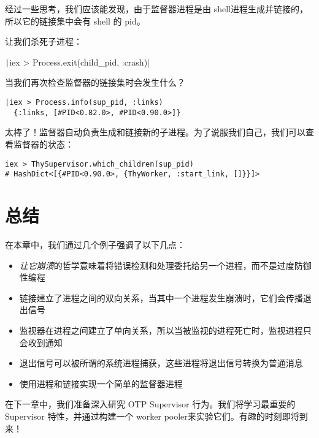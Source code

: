 经过一些思考，我们应该能发现，由于监督器进程是由 shell进程生成并链接的，所以它的链接集中会有 shell 的 pid。

让我们杀死子进程：

\texttt|iex > Process.exit(child_pid, :crash)|

当我们再次检查监督器的链接集时会发生什么？

\begin{verbatim}
|iex > Process.info(sup_pid, :links)
  {:links, [#PID<0.82.0>, #PID<0.90.0>]}
\end{verbatim}

太棒了！监督器自动负责生成和链接新的子进程。为了说服我们自己，我们可以查看监督器的状态：

\begin{verbatim}
iex > ThySupervisor.which_children(sup_pid)
# HashDict<[{#PID<0.90.0>, {ThyWorker, :start_link, []}}]>
\end{verbatim}

\section{总结}

在本章中，我们通过几个例子强调了以下几点：

\begin{itemize}

\item  \emph{让它崩溃}的哲学意味着将错误检测和处理委托给另一个进程，而不是过度防御性编程
\item  链接建立了进程之间的双向关系，当其中一个进程发生崩溃时，它们会传播退出信号
\item  监视器在进程之间建立了单向关系，所以当被监视的进程死亡时，监视进程只会收到通知
\item  退出信号可以被所谓的系统进程捕获，这些进程将退出信号转换为普通消息
\item  使用进程和链接实现一个简单的监督器进程
\end{itemize}

在下一章中，我们准备深入研究 OTP Supervisor 行为。我们将学习最重要的Supervisor 特性，并通过构建一个 worker pooler来实验它们。有趣的时刻即将到来！

